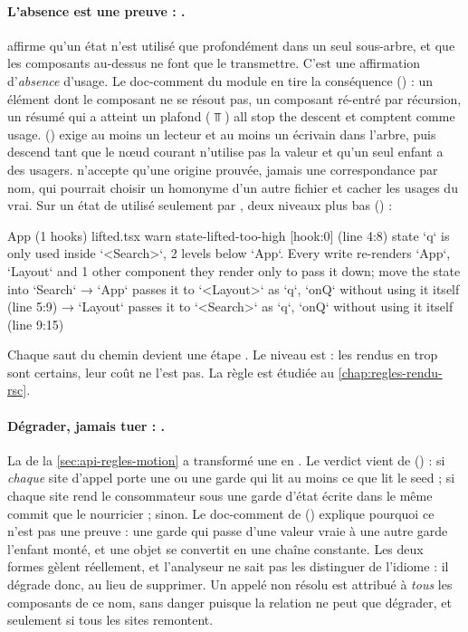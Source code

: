\paragraph{L'absence est une preuve : .}  affirme qu'un état n'est utilisé que profondément dans un seul sous-arbre, et que les composants au-dessus ne font que le transmettre. C'est une affirmation d'\emph{absence} d'usage. Le doc-comment du module en tire la conséquence () : un élément dont le composant ne se résout pas, un composant ré-entré par récursion, un résumé qui a atteint un plafond ($\Top$) \og all stop the descent\fg{} et comptent comme usage.  () exige au moins un lecteur et au moins un écrivain dans l'arbre, puis descend tant que le nœud courant n'utilise pas la valeur et qu'un seul enfant a des usagers.  n'accepte qu'une origine prouvée, jamais une correspondance par nom, qui pourrait choisir un homonyme d'un autre fichier et cacher les usages du vrai. Sur un état  de  utilisé seulement par , deux niveaux plus bas () :

\begin{sortie}
  App  (1 hooks)  lifted.tsx
    warn   state-lifted-too-high  [hook:0]  (line 4:8)  state `q` is only used inside `<Search>`, 2 levels below `App`. Every write re-renders `App`, `Layout` and 1 other component they render only to pass it down; move the state into `Search`
       → `App` passes it to `<Layout>` as `q`, `onQ` without using it itself (line 5:9)
       → `Layout` passes it to `<Search>` as `q`, `onQ` without using it itself (line 9:15)
\end{sortie}

Chaque saut du chemin devient une étape . Le niveau est \Warning{} : les rendus en trop sont certains, leur coût ne l'est pas. La règle est étudiée au \cref{chap:regles-rendu-rsc}.

\paragraph{Dégrader, jamais tuer : .} La  de la \cref{sec:api-regles-motion} a transformé une \Error{} en \Info. Le verdict vient de  () :  si \emph{chaque} site d'appel porte une  ou une garde qui lit au moins ce que lit le seed ;  si chaque site rend le consommateur sous une garde d'état écrite dans le même commit que le nourricier ;  sinon. Le doc-comment de  () explique pourquoi ce n'est pas une preuve : une garde qui passe d'une valeur vraie à une autre garde l'enfant monté, et une  objet se convertit en une chaîne constante. Les deux formes gèlent réellement, et l'analyseur ne sait pas les distinguer de l'idiome : il dégrade donc, au lieu de supprimer. Un appelé non résolu est attribué à \emph{tous} les composants de ce nom, sans danger puisque la relation ne peut que dégrader, et seulement si tous les sites remontent.

